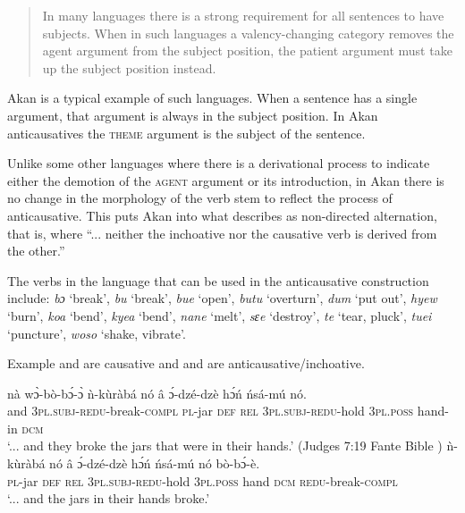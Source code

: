 \documentclass[output=paper]{langsci/langscibook}
\begin{document}
\begin{quote}
In many languages there is a strong requirement for all sentences to have subjects. When in such languages a valency-changing category removes the agent argument from the subject position, the patient argument must take up the subject position instead.
\end{quote}

Akan is a typical example of such languages. When a sentence has a single argument, that argument is always in the subject position. In Akan anticausatives the \textsc{theme} argument is the subject of the sentence. 

Unlike some other languages where there is a derivational process to indicate either the demotion of the \textsc{agent} argument or its introduction, in Akan there is no change in the morphology of the verb stem to reflect the process of anticausative. This puts Akan into what \citet[91]{haspelmath1993} describes as non-directed alternation, that is, where ``... neither the inchoative nor the causative verb is derived from the other.''

The verbs in the language that can be used in the anticausative construction include: \textit{bɔ} `break', \textit{bu} `break', \textit{bue} `open', \textit{butu} `overturn', \textit{dum} `put out', \textit{hyew} `burn', \textit{koa} `bend', \textit{kyea} `bend', \textit{nane} `melt', \textit{sɛe} `destroy', \textit{te} `tear, pluck', \textit{tuei} `puncture', \textit{woso} `shake, vibrate'. 

Example  and  are causative and  and  are anticausative/inchoative.

\ea\label{ex:33.osam}
\ea\label{ex:33a.osam}
\gll nà  wɔ̀-bò-bɔ́-ɔ̀  ǹ-kùràbá   nó â ɔ́-dzé-dzè    hɔ́ń    ńsá-mú    nó.\\
       and  \textsc{3pl.subj}-\textsc{redu}-break\textsc{-compl}  \textsc{pl}-jar    \textsc{def}  \textsc{rel}    \textsc{3pl.subj}-\textsc{redu}-hold  \textsc{3pl.poss}  hand-in  \textsc{dcm}\\
\glt `...  and they broke the jars that were in their hands.' (Judges 7:19 Fante Bible \citep{bible1974})
\ex\label{ex:33b.osam}
\gll   ǹ-kùràbá   nó  â ɔ́-dzé-dzè    hɔ́ń ńsá-mú    nó    bò-bɔ́-è. \\
       \textsc{pl}-jar    \textsc{def}  \textsc{rel}  \textsc{3pl.subj}-\textsc{redu}-hold  \textsc{3pl.poss}  hand    \textsc{dcm}    \textsc{redu}-break-\textsc{compl}\\
\glt `...  and the jars in their hands broke.'
\z 
\z 
\end{document}
